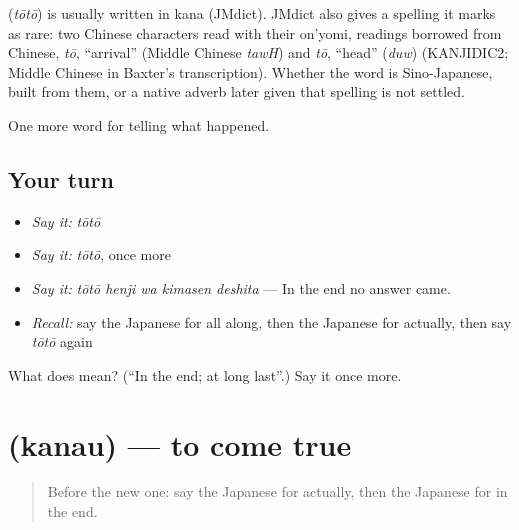 \begin{cousinweb}
\textbf{} (\emph{tōtō}) is usually written in kana (JMdict). JMdict also gives a spelling it marks as rare: two Chinese characters read with their on'yomi, readings borrowed from Chinese, \emph{tō}, \textquotedblleft{}arrival\textquotedblright{} (Middle Chinese \emph{tawH}) and \emph{tō}, \textquotedblleft{}head\textquotedblright{} (\emph{duw}) (KANJIDIC2; Middle Chinese in Baxter's transcription). Whether the word is Sino-Japanese, built from them, or a native adverb later given that spelling is not settled.
\end{cousinweb}

\begin{grammarlens}[title={What you've built}]
One more word for telling what happened.
\end{grammarlens}

\subsection*{Your turn}
\begin{itemize}
\raggedright
  \item \emph{Say it:} \emph{tōtō}
  \item \emph{Say it:} \emph{tōtō}, once more
  \item \emph{Say it:} \emph{tōtō henji wa kimasen deshita} — In the end no answer came.
  \item \emph{Recall:} say the Japanese for all along, then the Japanese for actually, then say \emph{tōtō} again
\end{itemize}

\begin{tcolorbox}[breakable,colback=teal!4,colframe=teal!35!black,title={Before you move on}]
What does  mean? (\textquotedblleft{}In the end; at long last\textquotedblright{}.) Say it once more.
\end{tcolorbox}
\section[\texorpdfstring{\ja{かなう} (kanau)}{かなう (kanau)}]{ (kanau) — to come true}

\label{lesson:JA-C310-kanau}



\begin{quote}
Before the new one: say the Japanese for actually, then the Japanese for in the end.
\end{quote}

